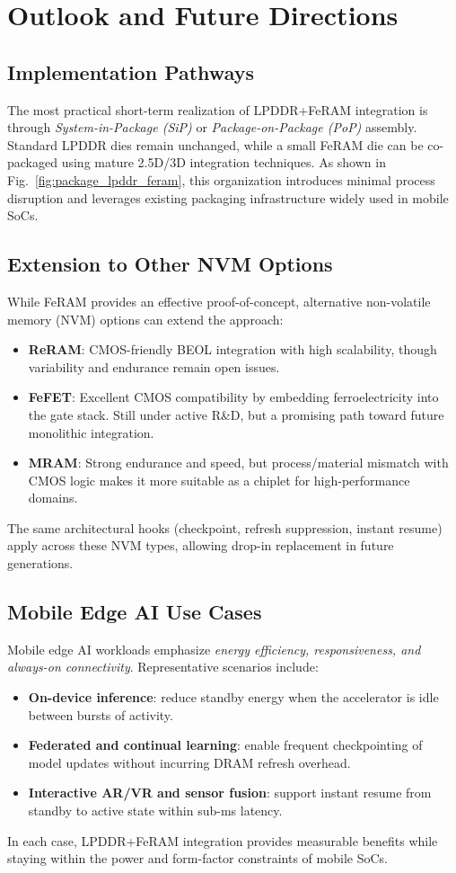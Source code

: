 \section{Outlook and Future Directions}

\subsection{Implementation Pathways}
The most practical short-term realization of LPDDR+FeRAM integration is through \emph{System-in-Package (SiP)} or \emph{Package-on-Package (PoP)} assembly. 
Standard LPDDR dies remain unchanged, while a small FeRAM die can be co-packaged using mature 2.5D/3D integration techniques.
As shown in Fig.~\ref{fig:package_lpddr_feram}, this organization introduces minimal process disruption and leverages existing packaging infrastructure widely used in mobile SoCs.

\subsection{Extension to Other NVM Options}
While FeRAM provides an effective proof-of-concept, alternative non-volatile memory (NVM) options can extend the approach:
\begin{itemize}
  \item \textbf{ReRAM}: CMOS-friendly BEOL integration with high scalability, though variability and endurance remain open issues.
  \item \textbf{FeFET}: Excellent CMOS compatibility by embedding ferroelectricity into the gate stack. Still under active R\&D, but a promising path toward future monolithic integration.
  \item \textbf{MRAM}: Strong endurance and speed, but process/material mismatch with CMOS logic makes it more suitable as a chiplet for high-performance domains.
\end{itemize}
The same architectural hooks (checkpoint, refresh suppression, instant resume) apply across these NVM types, allowing drop-in replacement in future generations.

\subsection{Mobile Edge AI Use Cases}
Mobile edge AI workloads emphasize \emph{energy efficiency, responsiveness, and always-on connectivity}. 
Representative scenarios include:
\begin{itemize}
  \item \textbf{On-device inference}: reduce standby energy when the accelerator is idle between bursts of activity.
  \item \textbf{Federated and continual learning}: enable frequent checkpointing of model updates without incurring DRAM refresh overhead.
  \item \textbf{Interactive AR/VR and sensor fusion}: support instant resume from standby to active state within sub-ms latency.
\end{itemize}
In each case, LPDDR+FeRAM integration provides measurable benefits while staying within the power and form-factor constraints of mobile SoCs.

